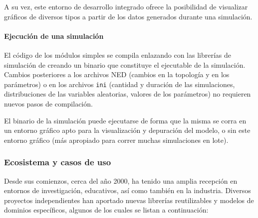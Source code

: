 \documentclass[]{article}
\begin{document}
A su vez, este entorno de desarrollo integrado ofrece la posibilidad de
visualizar gráficos de diversos tipos a partir de los datos generados durante
una simulación.

\paragraph{Ejecución de una simulación}

El código de los módulos simples se compila enlazando con las librerías de
simulación de \omnetpp{} creando un binario que constituye el ejecutable de la
simulación. Cambios posteriores a los archivos NED (cambios en la topología y
en los parámetros) o en los archivos \verb!ini! (cantidad y duración de las
simulaciones, distribuciones de las variables aleatorias, valores de los
parámetros) no requieren nuevos pasos de compilación.

El binario de la simulación puede ejecutarse de forma que la misma se
corra en un entorno gráfico apto para la visualización y depuración del modelo,
o sin este entorno gráfico (más apropiado para correr muchas simulaciones en
lote).

\subsubsection{Ecosistema y casos de uso}

Desde sus comienzos, cerca del año 2000, \omnetpp{} ha tenido una amplia recepción
en entornos de investigación, educativos, así como también en la industria.
Diversos proyectos independientes han aportado nuevas librerías reutilizables y
modelos de dominios específicos, algunos de los cuales se listan a
continuación:
\end{document}
